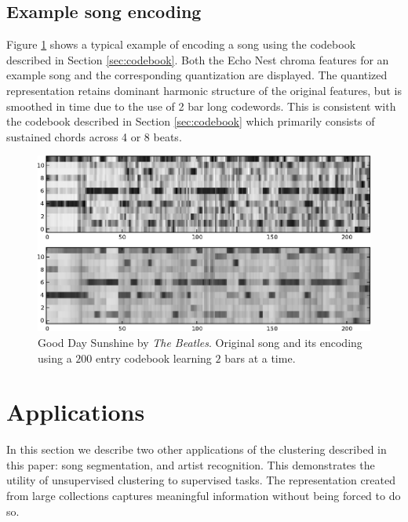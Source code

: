 \documentclass{article}
\begin{document}
\subsection{Example song encoding}

Figure \ref{fig:encodesong} shows a typical example of encoding a song
using the codebook described in Section \ref{sec:codebook}.  Both the
Echo Nest chroma features for an example song and the corresponding
quantization are displayed.  The quantized representation retains
dominant harmonic structure of the original features, but is smoothed
in time due to the use of 2 bar long codewords.
%
This is consistent with the codebook described in Section
\ref{sec:codebook} which primarily consists of sustained chords across
4 or 8 beats.

\begin{figure}[htb]
\begin{center}
\includegraphics[width=.9\columnwidth]{song_encoded}
\end{center}
\caption{\small{Good Day Sunshine by \textit{The Beatles}.
Original song and its encoding using a $200$ entry codebook learning
$2$ bars at a time.
}}
\label{fig:encodesong}
\end{figure}


\section{Applications}\label{sec:exps2}
In this section we describe two other applications of the clustering
described in this paper: song segmentation, and artist
recognition.  This demonstrates the utility of unsupervised clustering
to supervised tasks. The representation created from large collections
captures meaningful information without being forced to do so.
\end{document}
